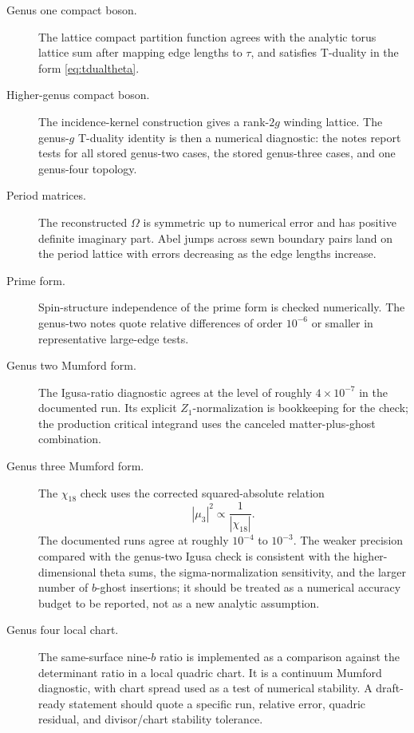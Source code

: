 \documentclass[11pt]{article}
\numberwithin{equation}{section}
\begin{document}
\begin{description}
\item[Genus one compact boson.]
The lattice compact partition function agrees with the analytic torus lattice
sum after mapping edge lengths to \(\tau\), and satisfies T-duality in the form
\eqref{eq:tdualtheta}.

\item[Higher-genus compact boson.]
The incidence-kernel construction gives a rank-\(2g\) winding lattice.  The
genus-\(g\) T-duality identity is then a numerical diagnostic: the notes report
tests for all stored genus-two cases, the stored genus-three cases, and one
genus-four topology.

\item[Period matrices.]
The reconstructed \(\Omega\) is symmetric up to numerical error and has
positive definite imaginary part.  Abel jumps across sewn boundary pairs land
on the period lattice with errors decreasing as the edge lengths increase.

\item[Prime form.]
Spin-structure independence of the prime form is checked numerically.  The
genus-two notes quote relative differences of order \(10^{-6}\) or smaller in
representative large-edge tests.

\item[Genus two Mumford form.]
The Igusa-ratio diagnostic agrees at the level of roughly \(4\times10^{-7}\)
in the documented run.  Its explicit \(Z_1\)-normalization is bookkeeping for
the check; the production critical integrand uses the canceled
matter-plus-ghost combination.

\item[Genus three Mumford form.]
The \(\chi_{18}\) check uses the corrected squared-absolute relation
\[
        |\mu_3|^2\propto \frac{1}{|\chi_{18}|}.
\]
The documented runs agree at roughly \(10^{-4}\) to \(10^{-3}\).  The weaker
precision compared with the genus-two Igusa check is consistent with the
higher-dimensional theta sums, the sigma-normalization sensitivity, and the
larger number of \(b\)-ghost insertions; it should be treated as a numerical
accuracy budget to be reported, not as a new analytic assumption.

\item[Genus four local chart.]
The same-surface nine-\(b\) ratio is implemented as a comparison against the
determinant ratio in a local quadric chart.  It is a continuum Mumford
diagnostic, with chart spread used as a test of numerical stability.  A
draft-ready statement should quote a specific run, relative error, quadric
residual, and divisor/chart stability tolerance.
\end{description}
\end{document}
